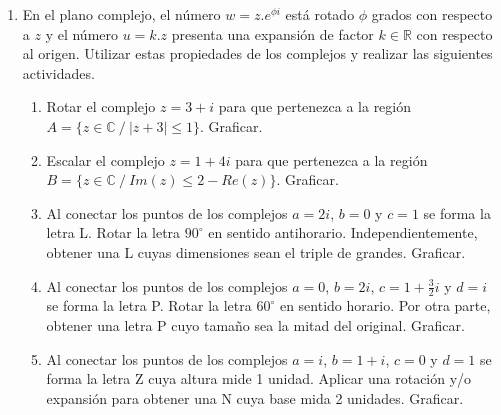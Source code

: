 \documentclass[a4paper]{article}
\newcommand{\exercise}{\item}
\newcommand{\df}[2]{\displaystyle\frac{#1}{#2}}
\begin{document}
\begin{enumerate}
\begin{multicols}{2}
\begin{enumerate} [label=(\alph*)]
		\item $4Im(z)=4 ~~\lor~~ 2<|z-3+i|$
	\end{enumerate}
	\end{multicols}
	\exercise En el plano complejo, el número $w=z.e^{\phi i}$ está rotado $\phi$ grados con respecto a $z$ y el número $u=k.z$ presenta una expansión de factor $k\in \mathbb{R}$ con respecto al origen. Utilizar estas propiedades de los complejos y realizar las siguientes actividades.
	\begin{enumerate} [label=(\alph*)]
		\item Rotar el complejo $z=3+i$ para que pertenezca a la región $A=\{ z \in \mathbb{C} ~/~ |z+3| \leq 1 \}$. Graficar.
		\item Escalar el complejo $z=1+4i$ para que pertenezca a la región $B=\{ z \in \mathbb{C} ~/~ Im(z) \leq 2 - Re(z) \}$. Graficar.
		\item Al conectar los puntos de los complejos $a=2i$, $b=0$ y $c=1$ se forma la letra L. Rotar la letra $90^{\circ}$ en sentido antihorario. Independientemente, obtener una L cuyas dimensiones sean el triple de grandes. Graficar.
		\item Al conectar los puntos de los complejos $a=0$, $b=2i$, $c=1+\df{3}{2}i$ y $d=i$ se forma la letra P. Rotar la letra $60^{\circ}$ en sentido horario. Por otra parte, obtener una letra P cuyo tamaño sea la mitad del original. Graficar.
		\item Al conectar los puntos de los complejos $a=i$, $b=1+i$, $c=0$ y $d=1$ se forma la letra Z cuya altura mide 1 unidad. Aplicar una rotación y/o expansión para obtener una N cuya base mida 2 unidades. Graficar.
	\end{enumerate}
\end{enumerate}
\vspace{20pt} 
\end{document}
